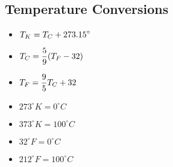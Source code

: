 \vspace{1em}

\noindent
{}

\vspace{2em}

\subsection{Temperature Conversions}
\begin{multicols}{2}
\begin{itemize}
\item $\displaystyle T_{K} = T_{C} + 273.15^\circ$
\item $\displaystyle T_{C} = \frac{5}{9}(T_{F} - 32)$
\item $\displaystyle T_{F} = \frac{9}{5}T_{C} + 32$
\end{itemize}
\begin{itemize}
\item $273^\circ K = 0^\circ C$
\item $373^\circ K = 100^\circ C$
\item $32^\circ F = 0^\circ C$
\item $212^\circ F = 100^\circ C$
\end{itemize}
\end{multicols}
